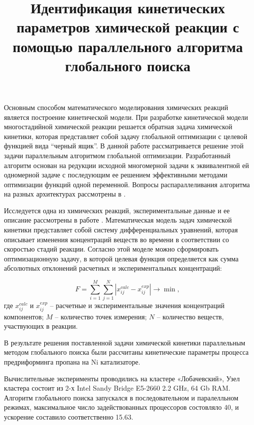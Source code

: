 \documentclass[11pt, oneside, a4paper]{article}
\begin{document}

\title{Идентификация кинетических параметров химической реакции с помощью параллельного алгоритма глобального поиска }


Основным способом математического моделирования химических реакций является построение кинетической модели. При разработке кинетической модели многостадийной химической реакции решается обратная задача химической кинетики, которая представляет собой задачу глобальной оптимизации с целевой функцией вида ``черный ящик''. В данной работе рассматривается решение этой задачи параллельным алгоритмом глобальной оптимизации.  Разработанный алгоритм основан на редукции исходной многомерной задачи к эквивалентной ей одномерной задаче с последующим ее решением эффективными методами оптимизации функций одной переменной. Вопросы распараллеливания алгоритма на разных архитектурах рассмотрены в \cite{Strongin13, Barkalov2016}. 

Исследуется одна из химических реакций, экспериментальные данные и ее описание рассмотрены в работе \cite {Uskov2020}. Математическая модель задач химической кинетики представляет собой систему дифференциальных уравнений, которая описывает изменения концентраций веществ во времени в соответствии со скоростью стадий реакции. Согласно этой моделе можно сформировать оптимизационную задачу, в которой целевая функция определяется как сумма абсолютных отклонений расчетных и экспериментальных концентраций:

\begin{displaymath}\label{func}
F = \sum\limits_{i=1}^M \sum\limits_{j=1}^N \left| x_{ij}^{calc} - x_{ij}^{exp} \right| \rightarrow \min,
\end{displaymath}
где $ x_ {ij} ^ {calc} $ и $ x_ {ij} ^ {exp} $ -- расчетные и экспериментальные значения концентраций компонентов; $ M $ -- количество точек измерения; $ N $ -- количество веществ, участвующих в реакции.

В результате решения поставленной задачи химической кинетики параллельным методом глобального поиска были рассчитаны кинетические параметры процесса предриформинга пропана на Ni катализаторе.

Вычислительные эксперименты проводились на кластере «Лобачевский», Узел кластера состоит из 2-х Intel Sandy Bridge E5-2660 2.2 GHz, 64 Gb RAM. Алгоритм глобального поиска запускался в последовательном и паралелльном режимах, максимальное число задействованных процессоров состовляло 40, и ускорение составило соответственно 15.63.
\end{document}

